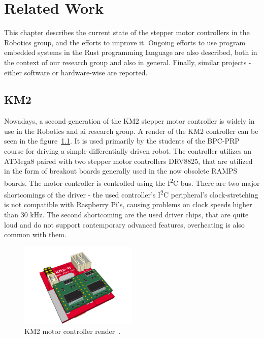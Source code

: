 \chapter{Related Work}
\label{ch:related_work}
This chapter describes the current state of the stepper motor controllers in the Robotics group, and the efforts to improve it.
Ongoing efforts to use program embedded systems in the Rust programming language are also described, both in the context of our research group and also in general.
Finally, similar projects - either software or hardware-wise are reported.

\section{KM2}
\label{sec:km2}
Nowadays, a second generation of the KM2 stepper motor controller is widely in use in the Robotics and \acs{ai} research group.
A render of the KM2 controller can be seen in the figure~\ref{fig:km2render}.
It is used primarily by the students of the BPC-PRP course for driving a simple differentially driven robot.
The controller utilizes an ATMega8 paired with two stepper motor controllers DRV8825, that are utilized in the form of breakout boards generally used in the now obsolete RAMPS boards.
The motor controller is controlled using the I\textsuperscript{2}C bus.
There are two major shortcomings of the driver - the used controller's I\textsuperscript{2}C peripheral's clock-stretching is not compatible with Raspberry Pi's, causing problems on clock speeds higher than 30 kHz.
The second shortcoming are the used driver chips, that are quite loud and do not support contemporary advanced features, overheating is also common with them.

\begin{figure}[H]
    \centering
    \includegraphics[width=0.5\textwidth]{obrazky/km2render}
    \caption{KM2 motor controller render~\cite{burian_km2renderpng_nodate}.}
    \label{fig:km2render}
\end{figure}

